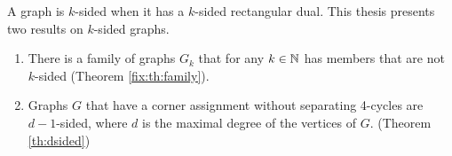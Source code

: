 
  A graph is $k$-sided when it has a $k$-sided rectangular dual. This thesis presents two results on $k$-sided graphs.

  \begin{enumerate}
    \item There is a family of graphs $G_k$ that for any $k \in \mathbb{N}$ has members that are not $k$-sided (Theorem \ref{fix:th:family}).
    \item Graphs $G$ that have a corner assignment without separating 4-cycles are $d-1$-sided, where $d$ is the maximal degree of the vertices of $G$. (Theorem \ref{th:dsided})
  \end{enumerate}
